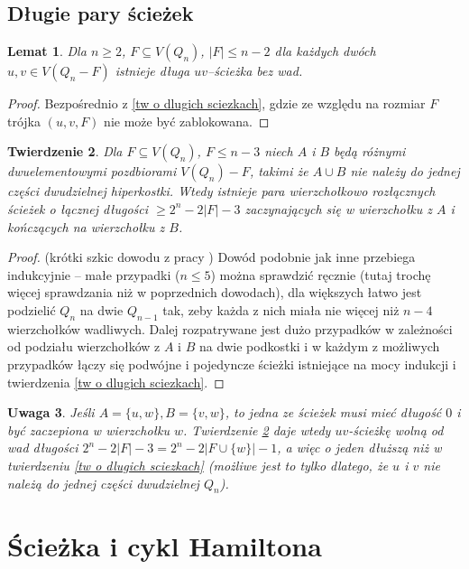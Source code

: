 \documentclass{pracamgr}
\newtheorem{theorem}{Twierdzenie}[chapter]
\newtheorem{lemma}[theorem]{Lemat}
\newtheorem{remark}[theorem]{Uwaga}
\begin{document}
  \section{Długie pary ścieżek}
   \begin{lemma}\label{zawsze dlugie sciezki}
    Dla $n\ge2$, $F\subseteq V(Q_n)$, $|F|\le n-2$ dla każdych dwóch $u,v\in V(Q_n-F)$ istnieje długa $uv$--ścieżka bez wad.
   \end{lemma}
   \begin{proof}
    Bezpośrednio z \ref{tw o dlugich sciezkach}, gdzie ze względu na rozmiar $F$ trójka $(u,v,F)$ nie może być zablokowana.
   \end{proof}
   \begin{theorem}\label{pary sciezek}
    Dla $F\subseteq V(Q_n)$, $F\le n-3$ niech $A$ i $B$ będą różnymi dwuelementowymi pozdbiorami $V(Q_n)-F$, takimi że $A\cup B$ nie należy do
    jednej części dwudzielnej hiperkostki. Wtedy istnieje para wierzchołkowo rozłącznych
    ścieżek o łącznej długości $\ge 2^n-2|F|-3$ zaczynających się w wierzchołku z $A$ i kończących na wierzchołku z $B$.
   \end{theorem}
   \begin{proof}
   (krótki szkic dowodu z pracy \cite{FG2})\newline
    Dowód podobnie jak inne przebiega indukcyjnie -- małe przypadki ($n\le 5$) można sprawdzić ręcznie (tutaj trochę więcej sprawdzania niż w poprzednich dowodach),
    dla większych łatwo jest podzielić $Q_n$ na dwie $Q_{n-1}$ tak, zeby każda z nich miała nie więcej niż $n-4$ wierzchołków wadliwych.
    Dalej rozpatrywane jest dużo przypadków w zależności od podziału wierzchołków z $A$ i $B$ na dwie podkostki i w każdym z możliwych przypadków łączy się
    podwójne i pojedyncze ścieżki istniejące na mocy indukcji i twierdzenia \ref{tw o dlugich sciezkach}.
   \end{proof}
   \begin{remark}\label{a cap B=(u)}
    Jeśli $A=\{u,w\}, B=\{v,w\}$, to jedna ze ścieżek musi mieć długość $0$ i być zaczepiona w wierzchołku $w$.
    Twierdzenie \ref{pary sciezek} daje wtedy $uv$-ścieżkę
    wolną od wad długości $2^n-2|F|-3=2^n-2|F\cup\{w\}|-1$, a więc o jeden dłuższą niż w twierdzeniu \ref{tw o dlugich sciezkach}
    (możliwe jest to tylko dlatego, że $u$ i $v$ nie należą do jednej części dwudzielnej $Q_n$).
   \end{remark}
   
 \chapter{Ścieżka i cykl Hamiltona}\label{Ham}
\end{document}
